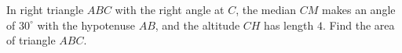In right triangle $ABC$ with the right angle at $C$, the median $CM$ makes an angle of $30^\circ$ with the hypotenuse $AB$, and the altitude $CH$ has length $4$. Find the area of triangle $ABC$.

